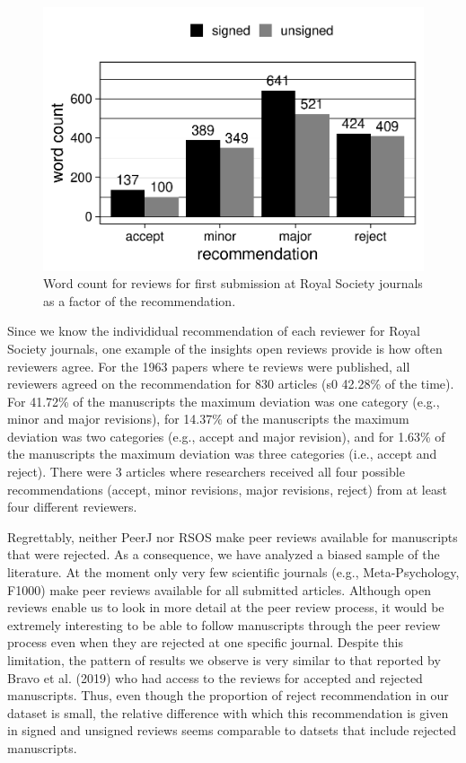 \documentclass[,jou, a4paper,floatsintext]{apa6}
\begin{document}
\begin{figure}
\centering
\includegraphics{open_peer_review_files/figure-latex/wordcount-1.pdf}
\caption{\label{fig:wordcount}Word count for reviews for first submission at Royal Society journals as a factor of the recommendation.}
\end{figure}

Since we know the individidual recommendation of each reviewer for Royal Society journals, one example of the insights open reviews provide is how often reviewers agree. For the 1963 papers where te reviews were published, all reviewers agreed on the recommendation for 830 articles (s0 42.28\% of the time). For 41.72\% of the manuscripts the maximum deviation was one category (e.g., minor and major revisions), for 14.37\% of the manuscripts the maximum deviation was two categories (e.g., accept and major revision), and for 1.63\% of the manuscripts the maximum deviation was three categories (i.e., accept and reject). There were 3 articles where researchers received all four possible recommendations (accept, minor revisions, major revisions, reject) from at least four different reviewers.

Regrettably, neither PeerJ nor RSOS make peer reviews available for manuscripts that were rejected. As a consequence, we have analyzed a biased sample of the literature. At the moment only very few scientific journals (e.g., Meta-Psychology, F1000) make peer reviews available for all submitted articles. Although open reviews enable us to look in more detail at the peer review process, it would be extremely interesting to be able to follow manuscripts through the peer review process even when they are rejected at one specific journal. Despite this limitation, the pattern of results we observe is very similar to that reported by Bravo et al. (2019) who had access to the reviews for accepted and rejected manuscripts. Thus, even though the proportion of reject recommendation in our dataset is small, the relative difference with which this recommendation is given in signed and unsigned reviews seems comparable to datsets that include rejected manuscripts.
\end{document}
